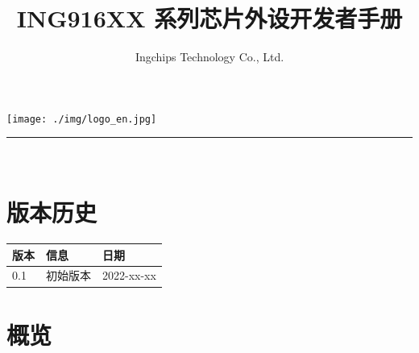 \documentclass[
  12pt,
]{book}
\title{ING916XX 系列芯片外设开发者手册}
\author{Ingchips Technology Co., Ltd.}
\date{}
\let\oldmaketitle\maketitle
\begin{document}
\maketitle

\thispagestyle{empty}
\begin{center}
\end{center}

\setlength{\abovedisplayskip}{-5pt}
\setlength{\abovedisplayshortskip}{-5pt}

\thispagestyle{empty}

\makeatletter
\begin{center}
    \vspace{5ex}
    \texttt{[image: ./img/logo\_en.jpg]}\\[15ex]
    {\huge  \@title }
    \noindent\rule{10cm}{0.4pt}\\[68ex]
    {\large \@author}
\end{center}
\makeatother


\newpage
\thispagestyle{empty}


{
\setcounter{tocdepth}{3}
\tableofcontents
}
\listoftables
\listoffigures
\mainmatter

\hypertarget{revision-history}{%
\chapter{版本历史}\label{revision-history}}

\begin{longtable}[]{@{}lll@{}}
\toprule
版本 & 信息 & 日期\tabularnewline
\midrule
\endhead
0.1 & 初始版本 & 2022-xx-xx\tabularnewline
\bottomrule
\end{longtable}

\hypertarget{ch-overview}{%
\chapter{概览}\label{ch-overview}}
\end{document}
